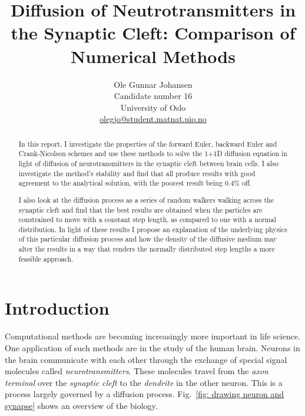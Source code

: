 \documentclass[twoside, 11pt]{article}
\title{\vspace{-15mm}\fontsize{15pt}{15pt}\selectfont\textbf{Diffusion of Neutrotransmitters in the Synaptic Cleft: Comparison of Numerical Methods}} %
\author{
\large
Ole Gunnar Johansen\\[0mm]%
Candidate number 16 \\
\normalsize University of Oslo \\[0mm] %
\normalsize \href{mailto:olegjo@ulrik.uio.no}{olegjo@student.matnat.uio.no} %
\vspace{5mm}
}
\date{}
\begin{document}
\maketitle %
\thispagestyle{fancy} %


\begin{abstract}

\noindent
In this report, I investigate the properties of the forward Euler, backward Euler and Crank-Nicolson schemes and use these methods to solve the 1+1D diffusion equation in light of diffusion of neurotransmitters in the synaptic cleft between brain cells. I also investigate the method's stability and find that all produce results with good agreement to the analytical solution, with the poorest result being 0.4\% off.

I also look at the diffusion process as a series of random walkers walking across the synaptic cleft and find that the best results are obtained when the particles are constrained to move with a constant step length, as compared to one with a normal distribution. In light of these results I propose an explanation of the underlying physics of this particular diffusion process and how the density of the diffusive medium may alter the results in a way that renders the normally distributed step lengths a more feasible approach.



\end{abstract}


\section{Introduction}
	Computational methods are becoming increasingly more important in life science. One application of such methods are in the study of the human brain.	Neurons in the brain communicate with each other through the exchange of special signal molecules called \textit{neurotransmitters}. These molecules travel from the \textit{axon terminal} over the \textit{synaptic cleft} to the \textit{dendrite} in the other neuron. This is a process largely governed by a diffusion process. Fig.~\ref{fig: drawing neuron and synapse} shows an overview of the biology.
	
\end{document}
